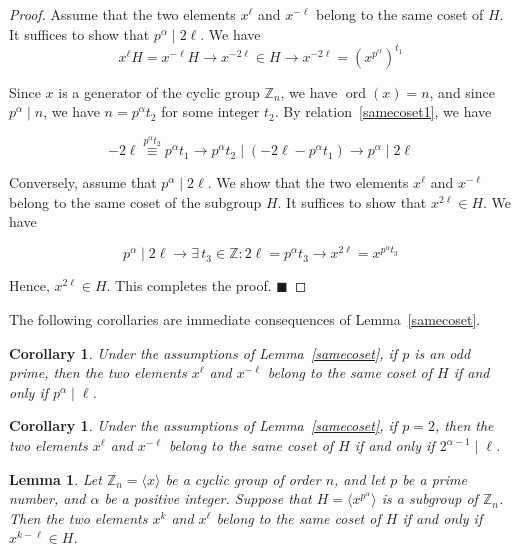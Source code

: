 \documentclass[12pt]{article}
\newtheorem{cor}[formula]{Corollary}
\newtheorem{lem}[formula]{Lemma}
\begin{document}
  \begin{proof}
  	Assume that the two elements $x^{\ell}$ and $x^{-\ell}$ belong to the same coset of $H$. It suffices to show that $p^{\alpha}\mid2\ell$. We have
  	\begin{equation}\label{samecoset1}
  		x^{\ell}H=x^{-\ell}H\rightarrow x^{-2\ell}\in H\rightarrow x^{-2\ell}=\left(x^{p^{\alpha}}\right)^{t_1}
  	\end{equation}
  	
    \noindent Since $x$ is a generator of the cyclic group $\mathbb{Z}_n$, we have $\operatorname{ord}(x)=n$, and since $p^{\alpha}\mid n$, we have $n=p^{\alpha}t_2$ for some integer $t_2$. By relation~\eqref{samecoset1}, we have
  	
  	\[
  	-2\ell\stackrel{p^{\alpha}t_2}{\equiv}p^{\alpha}t_1
  	\rightarrow
  	p^{\alpha}t_2\mid(-2\ell-p^{\alpha}t_1)
  	\rightarrow
  	p^{\alpha}\mid2\ell
  	\]
  	
  	\noindent Conversely, assume that $p^{\alpha}\mid2\ell$. We show that the two elements $x^{\ell}$ and $x^{-\ell}$ belong to the same coset of the subgroup $H$. It suffices to show that $x^{2\ell}\in H$. We have
  	
  	\[
  	p^{\alpha}\mid2\ell
  	\rightarrow
  	\exists\,t_3\in\mathbb{Z}:2\ell=p^{\alpha}t_3
  	\rightarrow
  	x^{2\ell}=x^{p^{\alpha}t_3}
  	\]
  	
  	\noindent Hence, $x^{2\ell}\in H$. This completes the proof.
  	\hfill$\blacksquare$
  \end{proof}
  The following corollaries are immediate consequences of Lemma~\ref{samecoset}.

  \begin{cor}\label{oddprime}
  	Under the assumptions of Lemma~\ref{samecoset}, if $p$ is an odd prime, then the two elements $x^\ell$ and $x^{-\ell}$ belong to the same coset of $H$ if and only if $p^\alpha\mid\ell$.
  \end{cor}

  \begin{cor}\label{power2}
  	Under the assumptions of Lemma~\ref{samecoset}, if $p=2$, then the two elements $x^\ell$ and $x^{-\ell}$ belong to the same coset of $H$ if and only if $2^{\alpha-1}\mid\ell$.
  \end{cor}
  \begin{lem}\label{samecoset2}
  	Let $\mathbb{Z}_n=\langle x\rangle$ be a cyclic group of order $n$, and let $p$ be a prime number, and $\alpha$ be a positive integer. Suppose that $H=\langle x^{p^\alpha}\rangle$ is a subgroup of $\mathbb{Z}_n$. Then the two elements $x^k$ and $x^\ell$ belong to the same coset of $H$ if and only if $x^{k-\ell}\in H$.
  \end{lem}
\end{document}
